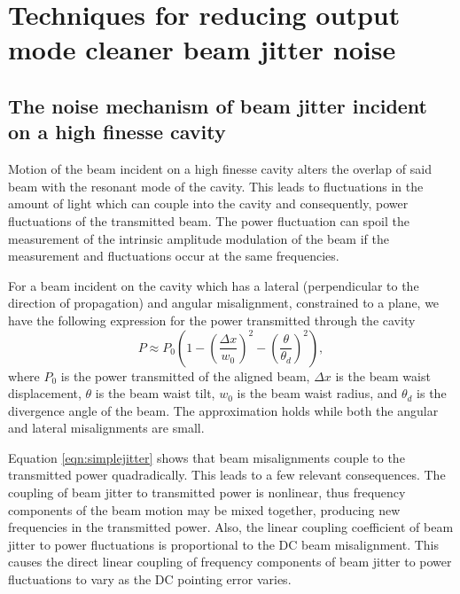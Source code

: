 \chapter{Techniques for reducing output mode cleaner beam jitter noise}
\cite{Kawamura:94}

\section{The noise mechanism of beam jitter incident on a high finesse cavity}

Motion of the beam incident on a high finesse cavity alters the overlap of said beam with the resonant mode of the cavity. %
This leads to fluctuations in the amount of light which can couple into the cavity and consequently, power fluctuations of the transmitted beam. %
The power fluctuation can spoil the measurement of the intrinsic amplitude modulation of the beam if the measurement and fluctuations occur at the same frequencies.

For a beam incident on the cavity which has a lateral (perpendicular to the direction of propagation) and angular misalignment, constrained to a plane, we have the following expression for the power transmitted through the cavity
\begin{equation}
\label{eqn:simplejitter}
P\approx P_0\left(1-\left(\frac{\Delta x}{w_0}\right)^2-\left(\frac{\theta}{\theta_d}\right)^2\right),
\end{equation}
where $P_0$ is the power transmitted of the aligned beam, $\Delta x$ is the beam waist displacement, $\theta$ is the beam waist tilt, $w_0$ is the beam waist radius, and $\theta_d$ is the divergence angle of the beam. %
The approximation holds while both the angular and lateral misalignments are small.

Equation \ref{eqn:simplejitter} shows that beam misalignments couple to the transmitted power quadradically. %
This leads to a few relevant consequences. %
The coupling of beam jitter to transmitted power is nonlinear, thus frequency components of the beam motion may be mixed together, producing new frequencies in the transmitted power. %
Also, the linear coupling coefficient of beam jitter to power fluctuations is proportional to the DC beam misalignment. %
This causes the direct linear coupling of frequency components of beam jitter to power fluctuations to vary as the DC pointing error varies.

